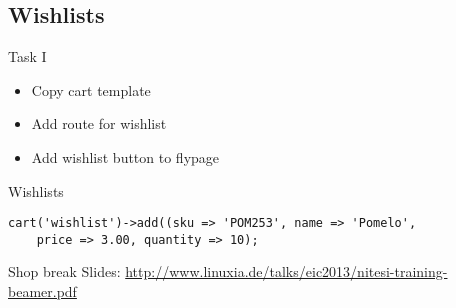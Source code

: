 \subsection{Wishlists}

\begin{frame}{Task I}
\begin{itemize}
\item Copy cart template
\item Add route for wishlist
\item Add wishlist button to flypage
\end{itemize}
\end{frame}

\begin{frame}[fragile]{Wishlists}
\begin{lstlisting}
cart('wishlist')->add((sku => 'POM253', name => 'Pomelo',
    price => 3.00, quantity => 10);
\end{lstlisting}
\end{frame}

\begin{frame}{Shop break}
Slides:
\url{http://www.linuxia.de/talks/eic2013/nitesi-training-beamer.pdf}
\end{frame}



